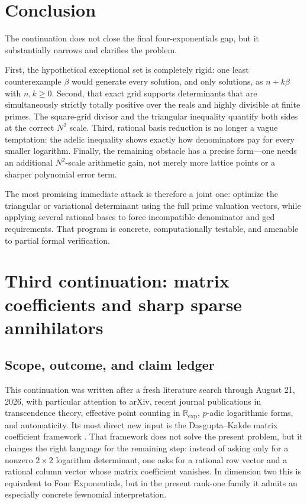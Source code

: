 \documentclass[11pt,oneside]{article}
\theoremstyle{definition}
\theoremstyle{remark}
\newcommand{\R}{\mathbb R}
\begin{document}
\section{Conclusion}

The continuation does not close the final four-exponentials gap, but it
substantially narrows and clarifies the problem.

First, the hypothetical exceptional set is completely rigid: one least
counterexample $\beta$ would generate every solution, and only solutions, as
$n+k\beta$ with $n,k\ge0$.  Second, that exact grid supports determinants that
are simultaneously strictly totally positive over the reals and highly
divisible at finite primes.  The square-grid divisor and the triangular
inequality quantify both sides at the correct $N^2$ scale.  Third, rational
basis reduction is no longer a vague temptation: the adelic inequality shows
exactly how denominators pay for every smaller logarithm.  Finally, the
remaining obstacle has a precise form---one needs an additional $N^2$-scale
arithmetic gain, not merely more lattice points or a sharper polynomial error
term.

The most promising immediate attack is therefore a joint one: optimize the
triangular or variational determinant using the full prime valuation vectors,
while applying several rational bases to force incompatible denominator and
gcd requirements.  That program is concrete, computationally testable, and
amenable to partial formal verification.

\section{Third continuation: matrix coefficients and sharp sparse annihilators}
\label{sec:sparse-continuation}

\subsection{Scope, outcome, and claim ledger}
\label{sec:sparse-scope}

This continuation was written after a fresh literature search through August 21, 2026, with
particular attention to arXiv, recent journal publications in transcendence theory, effective
point counting in $\R_{\exp}$, $p$-adic logarithmic forms, and automaticity.  Its most direct
new input is the Dasgupta--Kakde matrix coefficient framework
\cite{Dasgupta2023,DasguptaKakde2026}.  That framework does not solve the present problem,
but it changes the right language for the remaining step: instead of asking only for a
nonzero $2\times2$ logarithm determinant, one asks for a rational row vector and a rational
column vector whose matrix coefficient vanishes.  In dimension two this is equivalent to
Four Exponentials, but in the present rank-one family it admits an especially concrete
fewnomial interpretation.
\end{document}
